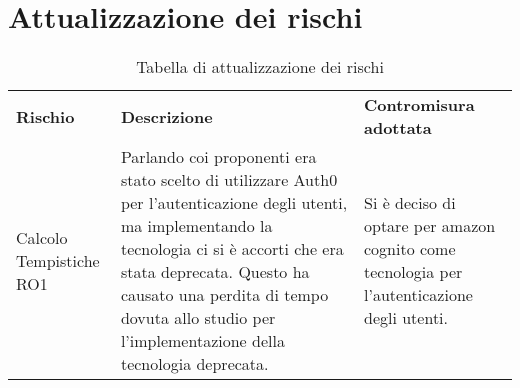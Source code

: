 \section{Attualizzazione dei rischi}
    \begin{center}
        \begin{table}[h!]
            \centering
            \caption{Tabella di attualizzazione dei rischi}
            \vspace{5px}
            \renewcommand{\arraystretch}{1.8}
            \begin{tabular}{p{90px} p{130px} p{150px}}
                \rowcolor{logo!70} \textbf{Rischio} & \textbf{Descrizione} & \textbf{Contromisura adottata}\\
                Calcolo Tempistiche RO1 & Parlando coi proponenti era stato scelto di utilizzare Auth0 per l'autenticazione degli utenti, ma implementando la tecnologia ci si è accorti che era stata deprecata. Questo ha causato una perdita di tempo dovuta allo studio per l'implementazione della tecnologia deprecata. & Si è deciso di optare per amazon cognito come tecnologia per l'autenticazione degli utenti. \\
            \end{tabular}
        \end{table}
    \end{center}
    